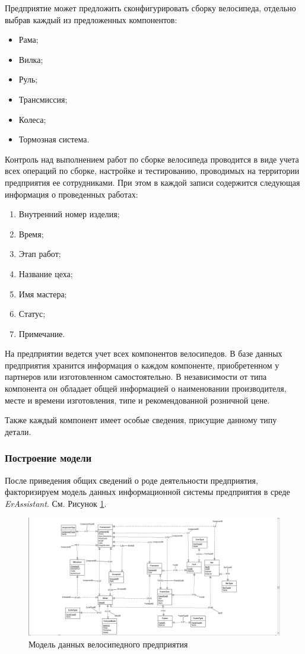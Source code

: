 \documentclass[a4paper,14pt]{extarticle}
\newcommand{\erassistant}{\textit{ErAssistant}}
\begin{document}
Предприятие может предложить сконфигурировать сборку велосипеда, отдельно выбрав каждый из предложенных компонентов:
\begin{itemize}
	\item Рама;
	\item Вилка;
	\item Руль;
	\item Трансмиссия;
	\item Колеса;
	\item Тормозная система.
\end{itemize}

Контроль над выполнением работ по сборке велосипеда проводится в виде учета всех операций по сборке, настройке и тестированию, проводимых на территории предприятия ее сотрудниками. При этом в каждой записи содержится следующая информация о проведенных работах:
\begin{enumerate}
	\item Внутренний номер изделия;
	\item Время;
	\item Этап работ;
	\item Название цеха;
	\item Имя мастера;
	\item Статус;
	\item Примечание.
\end{enumerate}

На предприятии ведется учет всех компонентов велосипедов.
В базе данных предприятия хранится информация о каждом компоненте, приобретенном у партнеров или изготовленном самостоятельно. В независимости от типа компонента он обладает общей информацией о наименовании производителя, месте и времени изготовления, типе и рекомендованной розничной цене. 

Также каждый компонент имеет особые сведения, присущие данному типу детали.

\subsubsection*{Построение модели}
После приведения общих сведений о роде деятельности предприятия, факторизируем модель данных информационной системы предприятия в среде \erassistant. См. Рисунок \ref{fig:1-cycle}.
\begin{figure}[hpbt]
	\centering
	\includegraphics[width=1\linewidth]{images/1-cycle}
	\caption{Модель данных велосипедного предприятия}
	\label{fig:1-cycle}
\end{figure}
\end{document}
